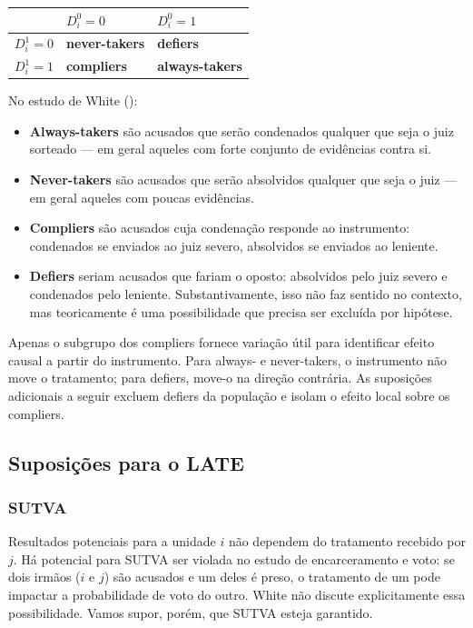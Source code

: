 \documentclass[
]{article}
\providecommand{\tightlist}{%
  \setlength{\itemsep}{0pt}\setlength{\parskip}{0pt}}
\begin{document}
\begin{longtable}[]{@{}lll@{}}
\toprule\noalign{}
& \(D^0_i = 0\) & \(D^0_i = 1\) \\
\midrule\noalign{}
\endhead
\bottomrule\noalign{}
\endlastfoot
\(D^1_i = 0\) & \textbf{never-takers} & \textbf{defiers} \\
\(D^1_i = 1\) & \textbf{compliers} & \textbf{always-takers} \\
\end{longtable}

No estudo de White ():

\begin{itemize}
\tightlist
\item
  \textbf{Always-takers} são acusados que serão condenados qualquer que seja o juiz sorteado --- em geral aqueles com forte conjunto de evidências contra si.
\item
  \textbf{Never-takers} são acusados que serão absolvidos qualquer que seja o juiz --- em geral aqueles com poucas evidências.
\item
  \textbf{Compliers} são acusados cuja condenação responde ao instrumento: condenados se enviados ao juiz severo, absolvidos se enviados ao leniente.
\item
  \textbf{Defiers} seriam acusados que fariam o oposto: absolvidos pelo juiz severo e condenados pelo leniente. Substantivamente, isso não faz sentido no contexto, mas teoricamente é uma possibilidade que precisa ser excluída por hipótese.
\end{itemize}

Apenas o subgrupo dos compliers fornece variação útil para identificar efeito causal a partir do instrumento. Para always- e never-takers, o instrumento não move o tratamento; para defiers, move-o na direção contrária. As suposições adicionais a seguir excluem defiers da população e isolam o efeito local sobre os compliers.

\subsection{Suposições para o LATE}\label{suposiuxe7uxf5es-para-o-late}

\subsubsection{SUTVA}\label{sutva}

Resultados potenciais para a unidade \(i\) não dependem do tratamento recebido por \(j\). Há potencial para SUTVA ser violada no estudo de encarceramento e voto: se dois irmãos (\(i\) e \(j\)) são acusados e um deles é preso, o tratamento de um pode impactar a probabilidade de voto do outro. White não discute explicitamente essa possibilidade. Vamos supor, porém, que SUTVA esteja garantido.
\end{document}
